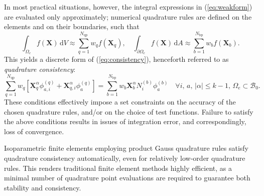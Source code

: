 In most practical situations, however, the integral expressions in (\ref{eq:weakform}) are evaluated only approximately; numerical quadrature rules are defined on the elements and on their boundaries, such that
\begin{equation}
  \int_{\Omega_e} f(\bm{X}) \, \mathrm dV \approx \sum_{q=1}^{N_{\mathrm q\mathrm p}} w_q f(\bm{X}_q), \quad \int_{\partial \Omega_e} f(\bm{X}) \, \mathrm dA \approx \sum_{b=1}^{N_{\mathrm b\mathrm p}} w_b f(\bm{X}_b).
\end{equation}
This yields a discrete form of (\ref{eq:consistency}), henceforth referred to as \textit{quadrature consistency}:
\begin{equation}
  \sum_{q=1}^{N_{\mathrm q\mathrm p}} w_q \left[ \bm{X}_q^{\alpha} \phi^{(q)}_{a,i} + \bm{X}^{\alpha}_{q,i} \phi^{(q)}_a \right] = \sum_{b=1}^{N_{\mathrm b\mathrm p}} w_b \bm{X}_b^{\alpha} N^{(b)}_i \phi^{(b)}_a \quad \forall i, \, a, \, | \alpha | \leq k-1, \, \Omega_e \subset \mathcal{B}_0.
  \label{eq:quadrature_consistency}
\end{equation}
These conditions effectively impose a set constraints on the accuracy of the chosen quadrature rules, and/or on the choice of test functions. Failure to satisfy the above conditions results in issues of integration error, and correspondingly, loss of convergence.

Isoparametric finite elements employing product Gauss quadrature rules satisfy quadrature consistency automatically, even for relatively low-order quadrature rules. This renders traditional finite element methods highly efficient, as a minimal number of quadrature point evaluations are required to guarantee both stability and consistency.